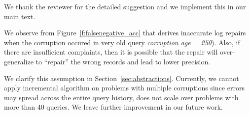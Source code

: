 \begin{quote}
\end{quote}

We thank the reviewer for the detailed suggestion and we implement this in our main text. 

\begin{quote}
\end{quote}

We observe from Figure~\ref{f:falsenegative_acc} that \sys derives inaccurate log repairs when the corruption occured in 
very old query  \textit{corruption age = 250}). Also, if there are insufficient complaints, then it is possible that the 
repair will over-generalize to  ``repair'' the wrong records and lead to lower precision.

 

\begin{quote}
\end{quote}

We clarify this assumption in Section~\ref{sec:abstractions}. Currently, we cannot apply incremental algorithm 
on problems with multiple corruptions since errors may spread across the entire query history, \sys 
does not scale over problems with more than 40 queries. We leave further improvement in our future work.



